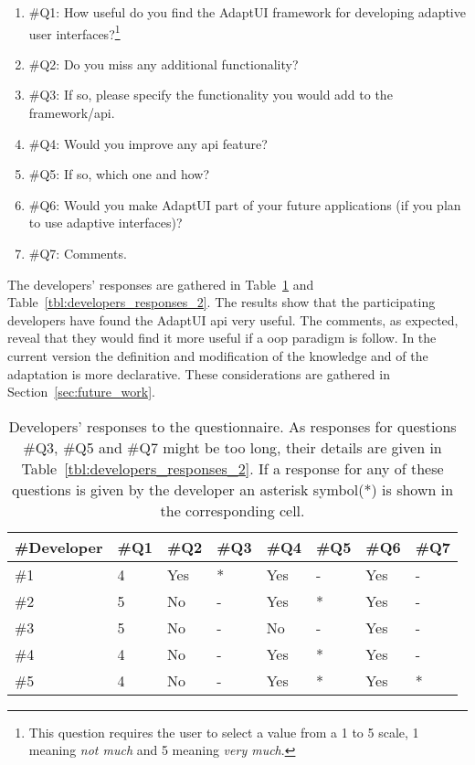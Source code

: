 \begin{enumerate}
 \item \#Q1: How useful do you find the AdaptUI framework for developing adaptive 
 user interfaces?\footnote{This question requires the user to select a value from
 a 1 to 5 scale, 1 meaning \textit{not much} and 5 meaning \textit{very much}.}
 \item \#Q2: Do you miss any additional functionality?
 \item \#Q3: If so, please specify the functionality you would add to the 
 framework/\ac{api}.
 \item \#Q4: Would you improve any \ac{api} feature?
 \item \#Q5: If so, which one and how?
 \item \#Q6: Would you make AdaptUI part of your future applications (if you 
 plan to use adaptive interfaces)?
 \item \#Q7: Comments.
\end{enumerate}

The developers' responses are gathered in Table~\ref{tbl:developers_responses}
and Table~\ref{tbl:developers_responses_2}. The results show that the participating 
developers have found the AdaptUI \ac{api} very useful. The comments, as expected, 
reveal that they would find it more useful if a \acs{oop} paradigm is follow. 
In the current version the definition and modification of the knowledge and of 
the adaptation is more declarative. These considerations are gathered in 
Section~\ref{sec:future_work}.

\begin{table}
  \caption{Developers' responses to the questionnaire. As responses for questions 
  \#Q3, \#Q5 and \#Q7 might be too long, their details are given in 
  Table~\ref{tbl:developers_responses_2}. If a response for any of these questions
  is given by the developer an asterisk symbol(*) is shown in the corresponding
  cell.}
 \label{tbl:developers_responses}
\footnotesize
\centering
 \begin{tabular}{l l l l l l l l}
  \hline 
  \textbf{\#Developer} 	& \textbf{\#Q1} & \textbf{\#Q2} & \textbf{\#Q3} & \textbf{\#Q4} & \textbf{\#Q5} & \textbf{\#Q6} & \textbf{\#Q7} \\
  \hline
  \#1			& 4		& Yes		& * 		& Yes	 	& - 		& Yes 		& - \\
  \#2			& 5		& No		& - 		& Yes		& *		& Yes		& - \\
  \#3			& 5		& No		& - 		& No		& -		& Yes		& - \\
  \#4			& 4		& No		& - 		& Yes		& *		& Yes		& - \\
  \#5			& 4		& No		& - 		& Yes		& *		& Yes		& * \\
  \hline
\end{tabular}
\end{table}

